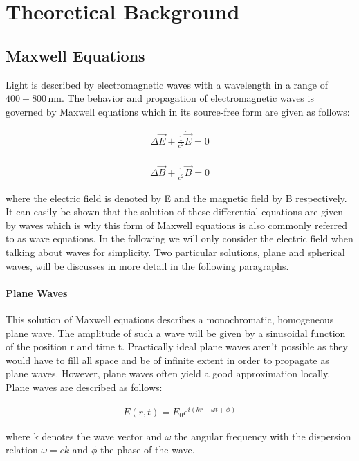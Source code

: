 \section{Theoretical Background}

\subsection{Maxwell Equations}

Light is described by electromagnetic waves with a wavelength in a range of $400-800\,\mathrm{nm}$. The behavior and propagation of electromagnetic waves is governed by Maxwell equations which in its source-free form are given as follows:

\begin{align}
\Delta \vec{E} + \frac{1}{c^2} \ddot{\vec{E}}= 0
\end{align}

\begin{align}
\Delta \vec{B} + \frac{1}{c^2} \ddot{\vec{B}}= 0
\end{align}

where the electric field is denoted by E and the magnetic field by B respectively. It can easily be shown that the solution of these differential equations are given by waves which is why this form of Maxwell equations is also commonly referred to as wave equations.\cite{demtroeder2} In the following we will only consider the electric field when talking about waves for simplicity. Two particular solutions, plane and spherical waves, will be discusses in more detail in the following paragraphs.
\paragraph{Plane Waves}

This solution of Maxwell equations describes a monochromatic, homogeneous plane wave. The amplitude of such a wave will be given by a sinusoidal function of the position r and time t. Practically ideal plane waves aren't possible as they would have to fill all space and be of infinite extent in order to propagate as plane waves. However, plane waves often yield a good approximation locally. Plane waves are described as follows:

\begin{align}
E\left(r, t \right) = E_0 e^{i(kr-\omega t + \phi)}
\end{align}

where k denotes the wave vector and $\omega$ the angular frequency with the dispersion relation $\omega = ck$ and $\phi$ the phase of the wave.
